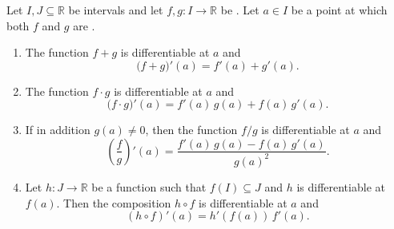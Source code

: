 \begin{proposition} \label{proposition:derivative_rules_for_sum_product_quotient_and_chain}
    Let $I, J \subseteq \mathbb{R}$ be intervals and let $f, g : I \to \mathbb{R}$ be . Let $a \in I$ be a point at which both $f$ and $g$ are .

    \begin{enumerate}
        \item[\textbf{(Sum rule)}] The function $f + g$ is differentiable at $a$ and
        $$\bigl(f + g\bigr)'(a) = f'(a) + g'(a).$$

        \item[\textbf{(Product rule)}] The function $f \cdot g$ is differentiable at $a$ and
        $$\bigl(f \cdot g\bigr)'(a) = f'(a)\,g(a) + f(a)\,g'(a).$$

        \item[\textbf{(Quotient rule)}] If in addition $g(a) \neq 0$, then the function $f/g$ is differentiable at $a$ and
        $$\left(\frac{f}{g}\right)'(a) = \frac{f'(a)\,g(a) - f(a)\,g'(a)}{g(a)^2}.$$

        \item[\textbf{(Chain rule)}] Let $h : J \to \mathbb{R}$ be a function such that $f(I) \subseteq J$ and $h$ is differentiable at $f(a)$. Then the composition $h \circ f$ is differentiable at $a$ and
        $$(h \circ f)'(a) = h'(f(a))\,f'(a).$$
    \end{enumerate}
\end{proposition}
